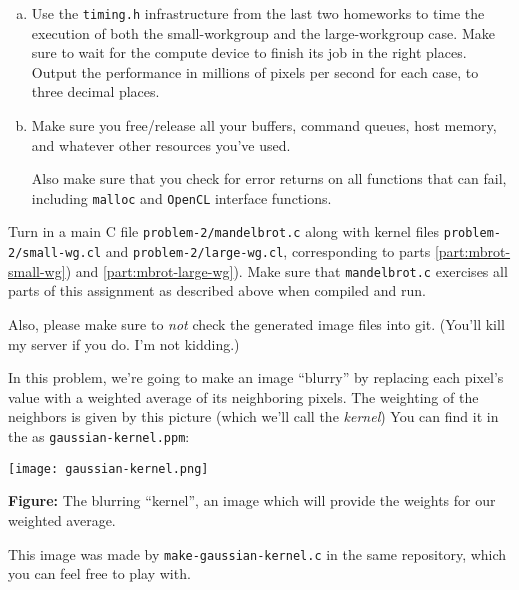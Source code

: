 \documentclass[11pt]{article}
\begin{document}
\begin{enumerate}[a)]
  \item Use the \texttt{timing.h} infrastructure from the last two
    homeworks to time the execution of both the small-workgroup and
    the large-workgroup case. Make sure to wait for the compute device
    to finish its job in the right places. Output the performance in
    millions of pixels per second for each case, to three decimal
    places.

  \item Make sure you free/release all your buffers, command queues, host
    memory, and whatever other resources you've used.

    Also make sure that you check for error returns on all functions
    that can fail, including \texttt{malloc} and \texttt{OpenCL}
    interface functions.
\end{enumerate}

Turn in a main C file \texttt{problem-2/mandelbrot.c} along with
kernel files \texttt{problem-2/small-wg.cl} and
\texttt{problem-2/large-wg.cl}, corresponding to parts
\ref{part:mbrot-small-wg}) and \ref{part:mbrot-large-wg}). Make sure that
\texttt{mandelbrot.c} exercises all parts of this assignment as
described above when compiled and run.

Also, please make sure to \emph{not} check the generated image files
into git. (You'll kill my server if you do. I'm not kidding.)

\bigskip
{}

In this problem, we're going to make an image ``blurry'' by replacing
each pixel's value with a weighted average of its neighboring pixels.
The weighting of the neighbors is given by this picture (which we'll call the
\emph{kernel}) You can find it in the
as \texttt{gaussian-kernel.ppm}:
\begin{center}
  \texttt{[image: gaussian-kernel.png]}

  \textbf{Figure:} The blurring ``kernel'', an
  image which will provide the weights for our weighted
  average.
\end{center}
This image was made by \texttt{make-gaussian-kernel.c} in the same
repository, which you can feel free to play with.
\end{document}
